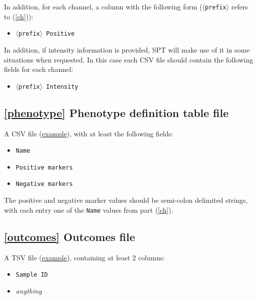 \documentclass[14pt]{article}
\begin{document}
In addition, for each channel, a column with the following form (\colorbox{yellow!25}{\texttt{$\langle$prefix$\rangle$}} refers to (\ref{ch})):

\begin{itemize}
  \itemsep0em
  \item[]{\colorbox{yellow!25}{\texttt{$\langle$prefix$\rangle$ Positive}}}
\end{itemize}


In addition, if intensity information is provided, SPT will make use of it in some situations when requested. In this case each CSV file should contain the following fields for each channel:

\begin{itemize}
  \itemsep0em
  \item[]{\colorbox{yellow!25}{\texttt{$\langle$prefix$\rangle$ Intensity}}}
\end{itemize}

\subsection*{\ref{phenotype} Phenotype definition table file} A CSV file (\href{https://github.com/nadeemlab/SPT/blob/main/tests/data/complex_phenotypes.csv}{example}), with at least the following fields:

\begin{itemize}
  \itemsep0em
  \item[]{\colorbox{yellow!25}{\texttt{Name}}}
  \item[]{\colorbox{yellow!25}{\texttt{Positive markers}}}
  \item[]{\colorbox{yellow!25}{\texttt{Negative markers}}}
\end{itemize}

The positive and negative marker values should be semi-colon delimited strings, with each entry one of the \colorbox{yellow!25}{\texttt{Name}} values from part (\ref{ch}).

\subsection*{\ref{outcomes} Outcomes file} A TSV file (\href{https://github.com/nadeemlab/SPT/blob/main/tests/data/diagnosis.tsv}{example}), containing at least 2 columns:

\begin{itemize}
  \itemsep0em
  \item[]{\colorbox{yellow!25}{\texttt{Sample ID}}}
  \item[]{\colorbox{yellow!25}{\emph{anything}}}
\end{itemize}
\end{document}
